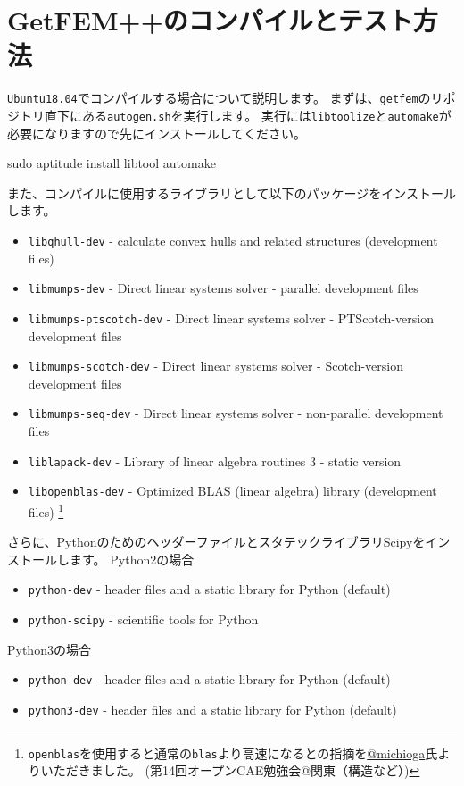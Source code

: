 \documentclass{../../style/ltjoc}
\begin{document}
\section{GetFEM++のコンパイルとテスト方法}
\texttt{Ubuntu18.04}でコンパイルする場合について説明します。
まずは、\texttt{getfem}のリポジトリ直下にある\texttt{autogen.sh}を実行します。
実行には\texttt{libtoolize}と\texttt{automake}が必要になりますので先にインストールしてください。
\begin{shbox}
  \shline{} {sudo aptitude install libtool automake}
\end{shbox}
また、コンパイルに使用するライブラリとして以下のパッケージをインストールします。
\begin{itemize}
  \item \texttt{libqhull-dev} - calculate convex hulls and related structures (development files)
  \item \texttt{libmumps-dev} - Direct linear systems solver - parallel development files                  
  \item \texttt{libmumps-ptscotch-dev} - Direct linear systems solver - PTScotch-version development files          
  \item \texttt{libmumps-scotch-dev} - Direct linear systems solver - Scotch-version development files            
  \item \texttt{libmumps-seq-dev} - Direct linear systems solver - non-parallel development files              
  \item \texttt{liblapack-dev} - Library of linear algebra routines 3 - static version
  \item \texttt{libopenblas-dev} - Optimized BLAS (linear algebra) library (development files)
  \footnote{
    \texttt{openblas}を使用すると通常の\texttt{blas}より高速になるとの指摘を\href{https://twitter.com/michioga}{@michioga}氏よりいただきました。
    (第14回オープンCAE勉強会@関東（構造など）)
  }
\end{itemize}
さらに、PythonのためのヘッダーファイルとスタテックライブラリScipyをインストールします。
Python2の場合
\begin{itemize}
  \item \texttt{python-dev} - header files and a static library for Python (default)
  \item \texttt{python-scipy} - scientific tools for Python
\end{itemize}
Python3の場合
\begin{itemize}
  \item \texttt{python-dev} - header files and a static library for Python (default)
  \item \texttt{python3-dev} - header files and a static library for Python (default)
\end{itemize}
\end{document}
